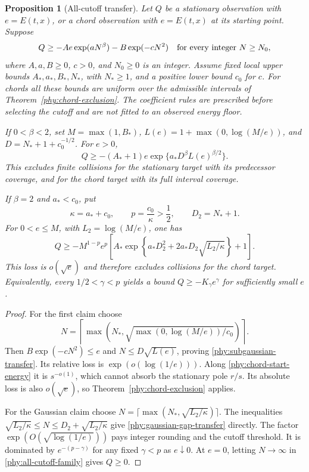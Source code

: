 \documentclass[11pt]{article}
\numberwithin{equation}{section}
\newtheorem{proposition}[theorem]{Proposition}
\theoremstyle{definition}
\theoremstyle{remark}
\begin{document}
\begin{proposition}[All-cutoff transfer]
\label{phy:cutoff-transfer}
Let $Q$ be a stationary observation with $e=E(t,x)$, or a chord
observation with $e=E(t,x)$ at its starting point.  Suppose
\begin{equation}
 Q\ge-Ae\exp(aN^\beta)-B\exp(-cN^2)
 \quad\hbox{for every integer }N\ge N_0,
 \label{phy:all-cutoff-family}
\end{equation}
where $A,a,B\ge0$, $c>0$, and $N_0\ge0$ is an integer.
Assume fixed local upper bounds $A_*,a_*,B_*,N_*$, with $N_*\ge1$,
and a positive lower bound $c_0$ for $c$.  For chords all these bounds
are uniform over the admissible intervals of
Theorem~\ref{phy:chord-exclusion}.  The coefficient rules are prescribed
before selecting the cutoff and are not fitted to an observed energy
floor.

If $0<\beta<2$, set
$M=\max(1,B_*)$, $L(e)=1+\max(0,\log(M/e))$, and
$D=N_*+1+c_0^{-1/2}$.  For $e>0$,
\begin{equation}
 Q\ge-(A_*+1)e\exp\{a_*D^\beta L(e)^{\beta/2}\}.
 \label{phy:subgaussian-transfer}
\end{equation}
This excludes finite collisions for the stationary target with its
predecessor coverage, and for the chord target with its full interval
coverage.

If $\beta=2$ and $a_*<c_0$, put
\[
 \kappa=a_*+c_0,\qquad p=\frac{c_0}{\kappa}>\frac12,
 \qquad D_2=N_*+1.
\]
For $0<e\le M$, with $L_2=\log(M/e)$, one has
\begin{equation}
 Q\ge-M^{1-p}e^p
 \left[A_*\exp\left\{a_*D_2^2+
        2a_*D_2\sqrt{L_2/\kappa}\right\}+1\right].
 \label{phy:gaussian-gap-transfer}
\end{equation}
This loss is $o(\sqrt e)$ and therefore excludes collisions for the
chord target.  Equivalently, every $1/2<\gamma<p$ yields a bound
$Q\ge-K_\gamma e^\gamma$ for sufficiently small $e$.
\end{proposition}
\begin{proof}
For the first claim choose
\[
 N=\left\lceil\max\left(N_*,
       \sqrt{\max(0,\log(M/e))/c_0}\right)\right\rceil.
\]
Then $B\exp(-cN^2)\le e$ and $N\le D\sqrt{L(e)}$, proving
\eqref{phy:subgaussian-transfer}.  Its relative loss is
$\exp(o(\log(1/e)))$.  Along \eqref{phy:chord-start-energy} it is
$s^{-o(1)}$, which cannot absorb the stationary pole $r/s$.
Its absolute loss is also $o(\sqrt e)$, so
Theorem~\ref{phy:chord-exclusion} applies.

For the Gaussian claim choose
$N=\lceil\max(N_*,\sqrt{L_2/\kappa})\rceil$.
The inequalities
$\sqrt{L_2/\kappa}\le N\le D_2+\sqrt{L_2/\kappa}$ give
\eqref{phy:gaussian-gap-transfer} directly.  The factor
$\exp(O(\sqrt{\log(1/e)}))$ pays integer rounding and the cutoff
threshold.  It is dominated by $e^{-(p-\gamma)}$ for any fixed
$\gamma<p$ as $e\downarrow0$.  At $e=0$, letting $N\to\infty$ in
\eqref{phy:all-cutoff-family} gives $Q\ge0$.
\end{proof}
\end{document}
